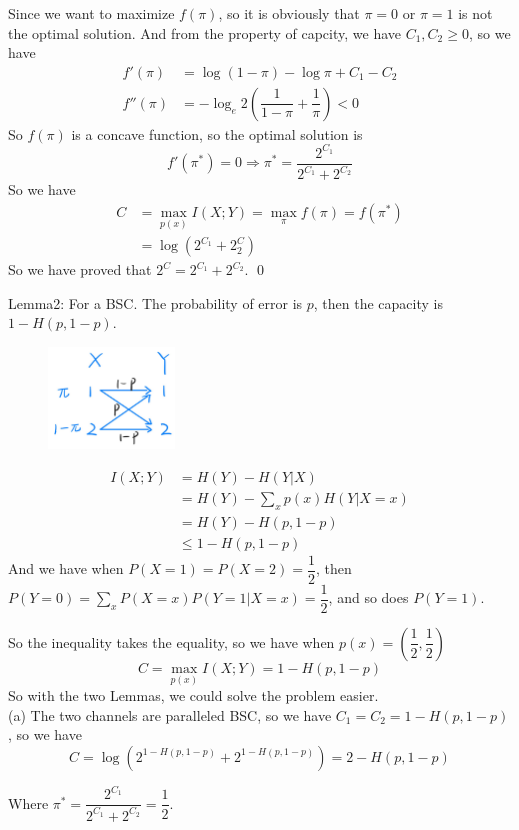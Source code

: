 Since we want to maximize $f(\pi)$, so it is obviously that $\pi=0$ or $\pi=1$ is not the optimal solution. And from the property of capcity, we have $C_1,C_2\geq 0$, so we have
\begin{align*}
f'(\pi) &= \log(1-\pi)-\log\pi+C_1-C_2 \\
f''(\pi) &= -\log_e2\left(\dfrac{1}{1-\pi}+\dfrac{1}{\pi}\right) < 0
\end{align*}
So $f(\pi)$ is a concave function, so the optimal solution is
$$f'(\pi^*)=0\Rightarrow \pi^*=\dfrac{2^{C_1}}{2^{C_1}+2^{C_2}}$$
So we have
\begin{align*}
C &= \max_{p(x)}I(X;Y) = \max_{\pi} f(\pi) = f(\pi^*) \\
&= \log \left(2^{C_1}+2^C_2\right)
\end{align*}
So we have proved that $2^C=2^{C_1}+2^{C_2}$. \qed

Lemma2: For a BSC. The probability of error is $p$, then the capacity is $1-H(p,1-p)$.
\begin{figure}[htbp]
    \centering
	\includegraphics[width=0.3\textwidth]{../figures/BSC.png}
\end{figure}
\begin{align*}
I(X;Y) &= H(Y) - H(Y|X) \\
&= H(Y)-\sum_{x}p(x)H(Y|X=x) \\
&= H(Y) - H(p,1-p) \\
&\leq 1 - H(p,1-p)
\end{align*}
And we have when $P(X=1)=P(X=2)=\dfrac{1}{2}$, then $P(Y=0)=\sum\limits_xP(X=x)P(Y=1|X=x)=\dfrac{1}{2}$, and so does $P(Y=1)$.

So the inequality takes the equality, so we have when $p(x)=\left(\dfrac{1}{2},\dfrac{1}{2}\right)$
$$C=\max_{p(x)}I(X;Y)=1-H(p,1-p)$$
So with the two Lemmas, we could solve the problem easier. \\

(a) The two channels are paralleled BSC, so we have $C_1=C_2=1-H(p,1-p)$, so we have
$$C=\log\left(2^{1-H(p,1-p)}+2^{1-H(p,1-p)}\right)=2-H(p,1-p)$$

Where $\pi^*=\dfrac{2^{C_1}}{2^{C_1}+2^{C_2}}=\dfrac{1}{2}$.

